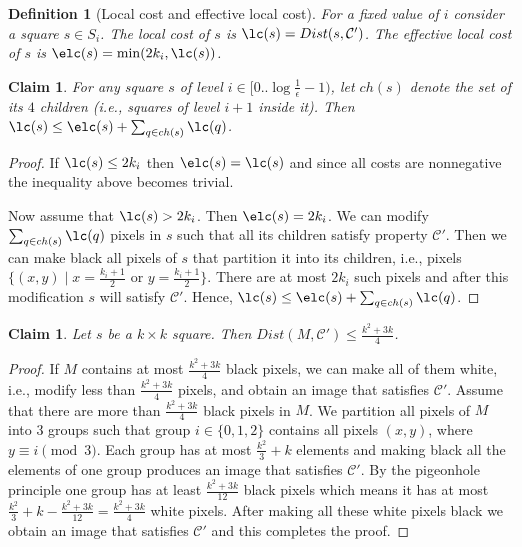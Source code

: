 \documentclass[11pt,english]{article}
\newtheorem{claim}[theorem]{Claim}
\newtheorem{definition}{Definition}[section]
\numberwithin{figure}{section}
\newcommand{\C}{{\mathcal C}}
\newcommand{\eps}{{\epsilon}}
\newcommand{\Dis}{Dist}
\newcommand{\integerset}[1]{[0..{#1})}
\begin{document}
\begin{definition}[Local cost and effective local cost]
For a fixed value of $i$ consider a square $s\in S_{i}$.
The \emph{local cost} of $s$ is $\lc(s)=\Dis(s,\C')$. The \emph{effective local cost} of $s$ is
$\elc(s)=\min(2k_{i},\lc(s))$.
\end{definition}
\begin{claim}
\label{cl:parent_children_cost_relation}
For any square $s$ of level $i\in \integerset{\log\frac{1}{\eps}-1}$, let $ch(s)$ denote the set of its $4$ children (i.e.,
squares of level $i+1$ inside it).
Then $\lc(s)\leq \elc(s)+\sum\nolimits_{q\in ch(s)} \lc(q)$.
\end{claim}
\begin{proof}
If $\lc(s)\leq 2k_{i}$ then $\elc(s)=\lc(s)$ and since all costs are nonnegative
the inequality above becomes trivial.

Now assume that $\lc(s)>2k_{i}$. Then $\elc(s)=2k_{i}$. We can modify
$\sum\nolimits_{q\in ch(s)} \lc(q)$ pixels in $s$ such that all its children
satisfy property $\C'$. Then we can make black all pixels of $s$ that
partition it into its children, i.e., pixels $\{(x,y)\mid
x=\frac{k_{i}+1}{2}$ or $y=\frac{k_{i}+1}{2}\}$. There are at most $2k_{i}$ such
pixels and after this modification $s$ will satisfy $\C'$. Hence,
$\lc(s)\leq \elc(s)+\sum\nolimits_{q\in ch(s)} \lc(q)$.
\end{proof}
\begin{claim}
\label{cl:max_dist_to_border_connectedness}
Let $s$ be a $k\times k$ square. Then $\Dis(M,\C')\leq
\frac{k^{2}+3k}{4}$.
\end{claim}
\begin{proof}
 If $M$ contains at most $\frac{k^{2}+3k}{4}$ black pixels, we can make all of them white, i.e.,
 modify less than $\frac{k^{2}+3k}{4}$ pixels, and obtain an image that satisfies $\C'$.
 Assume that there are more than  $\frac{k^{2}+3k}{4}$ black pixels in $M$. We partition all
 pixels of $M$ into $3$ groups such that group $i\in\{0,1,2\}$ contains all pixels $(x,y)$, where $y\equiv i\pmod 3$. Each group has at most $\frac{k^{2}}{3}+k$ elements and making black all the elements of one group produces an image that satisfies $\C'$. By the pigeonhole principle one group has at least $\frac{k^{2}+3k}{12}$ black pixels which means it has at most $\frac{k^{2}}{3}+k-\frac{k^{2}+3k}{12}=\frac{k^{2}+3k}{4}$ white pixels. After making all these white pixels black we obtain an image that satisfies $\C'$ and this completes the proof.
\end{proof}
\end{document}
